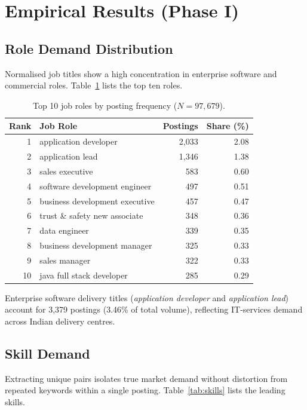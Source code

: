 \documentclass[10pt,a4paper]{article}
\newcommand{\code}[1]{\texttt{\small\detokenize{#1}}}
\begin{document}
\section{Empirical Results (Phase I)}

\subsection{Role Demand Distribution}
Normalised job titles show a high concentration in enterprise software and commercial roles. Table~\ref{tab:roles} lists the top ten roles.

\begin{table}[htbp]
\centering
\small
\begin{tabular}{@{}rlrr@{}}
\toprule
\textbf{Rank} & \textbf{Job Role} & \textbf{Postings} & \textbf{Share (\%)} \\
\midrule
1 & application developer & 2,033 & 2.08 \\
2 & application lead & 1,346 & 1.38 \\
3 & sales executive & 583 & 0.60 \\
4 & software development engineer & 497 & 0.51 \\
5 & business development executive & 457 & 0.47 \\
6 & trust \& safety new associate & 348 & 0.36 \\
7 & data engineer & 339 & 0.35 \\
8 & business development manager & 325 & 0.33 \\
9 & sales manager & 322 & 0.33 \\
10 & java full stack developer & 285 & 0.29 \\
\bottomrule
\end{tabular}
\caption{Top 10 job roles by posting frequency ($N = 97{,}679$).}
\label{tab:roles}
\end{table}

Enterprise software delivery titles (\textit{application developer} and \textit{application lead}) account for 3,379 postings (3.46\% of total volume), reflecting IT-services demand across Indian delivery centres.

\subsection{Skill Demand}
Extracting unique \code{(job_id, skill)} pairs isolates true market demand without distortion from repeated keywords within a single posting. Table~\ref{tab:skills} lists the leading skills.
\end{document}
